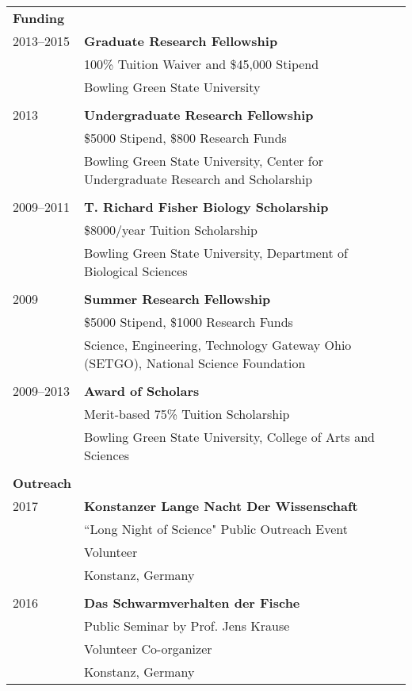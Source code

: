 \documentclass[letterpaper,10pt,oneside]{article}
\begin{document}
\begin{longtable}{@{} l p{5.3in}l}
 \Large{\textbf{Funding}}  \vspace{5mm} \\
 \large{2013–2015}
     & \textbf{Graduate Research Fellowship} \\
     & 100\% Tuition Waiver and \$45,000 Stipend \\
     & Bowling Green State University \\
     & \\
 \large{2013}
& \textbf{Undergraduate Research Fellowship} \\
& \$5000 Stipend, \$800 Research Funds \\
& Bowling Green State University, Center for Undergraduate Research and Scholarship \\
& \\
 \large{2009–2011}
& \textbf{T. Richard Fisher Biology Scholarship} \\
& \$8000/year Tuition Scholarship \\
& Bowling Green State University, Department of Biological Sciences \\
& \\
 \large{2009}
& \textbf{Summer Research Fellowship} \\
& \$5000 Stipend, \$1000 Research Funds \\
& Science, Engineering, Technology Gateway Ohio (SETGO), National Science Foundation \\
& \\
 \large{2009–2013}
& \textbf{Award of Scholars} \\
& Merit-based 75\% Tuition Scholarship \\
& Bowling Green State University, College of Arts and Sciences \\
& \\
 \Large{\textbf{Outreach}}  \vspace{5mm} \\
\large{2017}
& \textbf{Konstanzer Lange Nacht Der Wissenschaft} \\
& ``Long Night of Science" Public Outreach Event \\
& Volunteer \\
& Konstanz, Germany \\
& \\
\large{2016}
& \textbf{Das Schwarmverhalten der Fische} \\
& Public Seminar by Prof. Jens Krause \\
& Volunteer Co-organizer \\
& Konstanz, Germany \\

\end{longtable}
\end{document}
